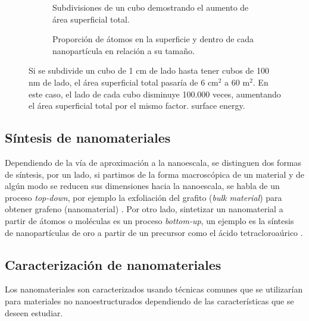 \begin{figure}[h!]
	\centering
	\begin{subfigure}{\textwidth}
		\caption[Subdivisiones de un cubo demostrando el aumento de área superficial total]{Subdivisiones de un cubo demostrando el aumento de área superficial total.}
		\label{fig:area_cubes}
	\end{subfigure}
	\begin{subfigure}{\textwidth}
			\caption{Proporción de átomos en la superficie y dentro de cada nanopartícula en relación a su tamaño.}
			\label{fig:graph_nanocube}
	\end{subfigure}
	\caption[Aumento de área superficial y proporcion de átomos en superficie al disminuir el tamaño de las nanopartículas]{Si se subdivide un cubo de 1 cm de lado hasta tener cubos de 100 nm de lado, el área superficial total pasaría de 6 $\mathrm{cm^2}$ a 60 $\mathrm{m^2}$. En este caso, el lado de cada cubo disminuye 100.000 veces, aumentando el área superficial total por el mismo factor.  surface energy.}
\end{figure}

\subsection{Síntesis de nanomateriales}
Dependiendo de la vía de aproximación a la nanoescala, se distinguen dos formas de síntesis, por un lado, si partimos de la forma macroscópica de un material y de algún modo se reducen sus dimensiones hacia la nanoescala, se habla de un proceso \textit{top-down}, por ejemplo la exfoliación del grafito (\textit{bulk material}) para obtener grafeno (nanomaterial) \citep{Novoselov2004}.  Por otro lado, sintetizar un nanomaterial a partir de átomos o moléculas es un proceso \textit{bottom-up}, un ejemplo es la síntesis de nanopartículas de oro a partir de un precursor como el ácido tetracloroaúrico \citep{Daniel2004}.

\subsection{Caracterización de nanomateriales}
Los nanomateriales son caracterizados usando técnicas comunes que se utilizarían para materiales no nanoestructurados dependiendo de las características que se deseen estudiar.
